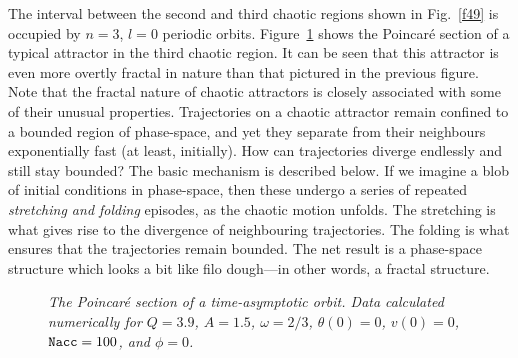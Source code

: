 The interval between the second and third chaotic regions shown in Fig.~\ref{f49} is
occupied by $n=3$, $l=0$ periodic orbits. Figure~\ref{f52} shows the Poincar\'{e} section 
of a typical attractor in the
third chaotic region. It can be seen that this attractor is even more overtly fractal
in nature than that pictured in the previous figure. Note that the fractal nature
of chaotic attractors is closely associated with some of their  unusual properties. 
Trajectories on a chaotic attractor remain confined to a bounded region of phase-space,
and yet they separate from their neighbours exponentially fast (at least, initially). 
How can trajectories diverge endlessly and still stay bounded? The basic mechanism
is described below.
If we imagine
a blob of initial conditions in phase-space, then these undergo a series of
repeated {\em stretching and folding} episodes, as the chaotic motion unfolds. The stretching is
what gives rise to the divergence of neighbouring trajectories. The folding is what ensures that
the trajectories remain bounded. 
The net
result is a phase-space structure which looks  a bit like filo dough---in other words, a fractal
structure. 

\begin{figure}
\epsfysize=3in
\centerline{}
\caption{\em The Poincar\'{e} section of a time-asymptotic
orbit. Data  calculated numerically for $Q=3.9$, $A=1.5$, $\omega=2/3$, $\theta(0)=0$,
$v(0)=0$, ${\tt Nacc} = 100$,  and $\phi=0$. }\label{f52}
\end{figure}
